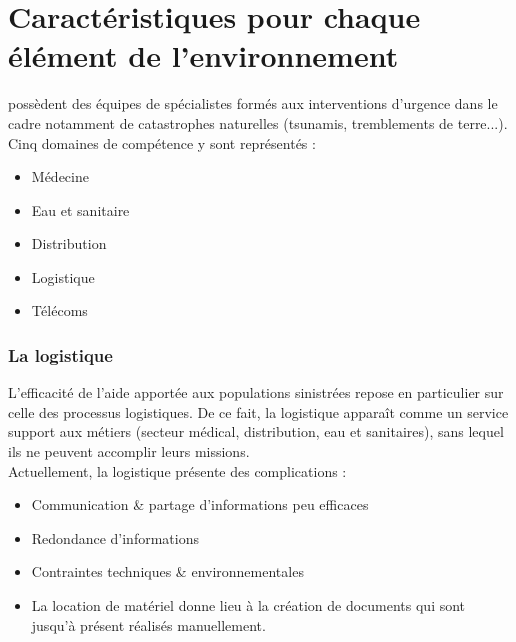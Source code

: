 \section{Caractéristiques pour chaque élément de l'environnement}
\mo possèdent des équipes de spécialistes formés aux interventions d'urgence dans le cadre notamment de catastrophes naturelles (tsunamis, tremblements de terre...).
Cinq domaines de compétence y sont représentés :
\begin{itemize}
\item Médecine
\item Eau et sanitaire
\item Distribution
\item Logistique
\item Télécoms
\end{itemize}

\subsubsection{La logistique}
L'efficacité de l'aide apportée aux populations sinistrées repose en particulier sur celle des processus logistiques. De ce fait, la logistique apparaît comme un service support aux métiers (secteur médical, distribution, eau et sanitaires), sans lequel ils ne peuvent accomplir leurs missions.
\\
Actuellement, la logistique présente des complications :
\begin{itemize}
\item Communication \& partage d'informations peu efficaces
\item Redondance d'informations
\item Contraintes techniques \& environnementales
\item La location de matériel donne lieu à la création de documents qui sont jusqu'à présent réalisés manuellement.
\end{itemize}

